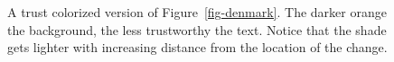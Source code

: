 \begin{figure}[t]
\centering
{}
\caption{A trust colorized version of Figure~\ref{fig-denmark}.
    The darker orange the background, the less trustworthy
    the text.
    Notice that the shade gets lighter with increasing distance
    from the location of the change.}
\label{fig-trust-ex}
\end{figure}


